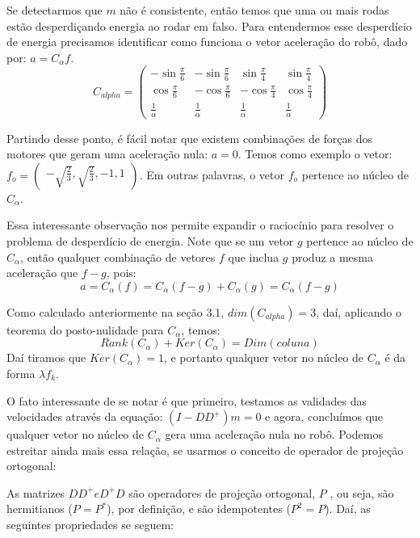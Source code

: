 \documentclass{article}
\begin{document}
\hspace{1cm}Se detectarmos que $m$ não é consistente, então temos que uma ou mais rodas estão desperdiçando energia ao rodar em falso. Para entendermos esse desperdício de energia precisamos identificar como funciona o vetor aceleração do robô, dado por: $ a = C_{\alpha}f$.
\[C_{alpha}
=
\begin{pmatrix}
  -\sin{\frac{\pi}{6}} & -\sin{\frac{\pi}{6}} & \sin{\frac{\pi}{4}} & \sin{\frac{\pi}{4}} \\
  \cos{\frac{\pi}{6}} &  -\cos{\frac{\pi}{6}} &  -\cos{\frac{\pi}{4}} &  \cos{\frac{\pi}{4}} \\
 \frac{1}{\alpha} & \frac{1}{\alpha} &\frac{1}{\alpha} & \frac{1}{\alpha}
 \end{pmatrix}
\]

Partindo desse ponto, é fácil notar que existem combinações de forças dos motores que geram uma aceleração nula: $ a = 0 $. Temos como exemplo o vetor: $f_{o} = \begin{pmatrix} -\sqrt{\frac{2}{3}},\sqrt{\frac{2}{3}},-1,1\end{pmatrix}$. Em outras palavras, o vetor $f_{o}$ pertence ao núcleo de $C_{\alpha}$.

Essa interessante observação nos permite expandir o raciocínio para resolver o problema de desperdício de energia. Note que se um vetor $g$ pertence ao núcleo de $C_{\alpha}$, então qualquer combinação de vetores $f$ que inclua $g$ produz a mesma aceleração que $f - g$, pois:
\[ a = C_{\alpha}(f) = C_{\alpha}(f-g) + C_{\alpha}(g) = C_{\alpha}(f-g)\]


Como calculado anteriormente na seção 3.1, $dim(C_{alpha}) = 3$, daí, aplicando o teorema do posto-nulidade para $C_{\alpha}$, temos:
\[Rank(C_{\alpha}) + Ker(C_{\alpha}) = Dim(coluna)\]
Daí tiramos que $Ker(C_{\alpha}) = 1 $, e portanto qualquer vetor no núcleo de $C_{\alpha}$ é da forma $\lambda f_{k}$.

O fato interessante de se notar é que primeiro, testamos as validades das velocidades através da equação: $(I-DD^+)m = 0$ e agora, concluímos que qualquer vetor no núcleo de $C_{\alpha}$ gera uma aceleração nula no robô. Podemos estreitar ainda mais essa relação, se usarmos o conceito de operador de projeção ortogonal:

As matrizes $DD^+ e D^+D$ são operadores de projeção ortogonal, $P$ , ou seja, são hermitianos ($P = P^*$), por definição, e são idempotentes ($P^2 = P$). Daí, as seguintes propriedades se seguem:
\end{document}
